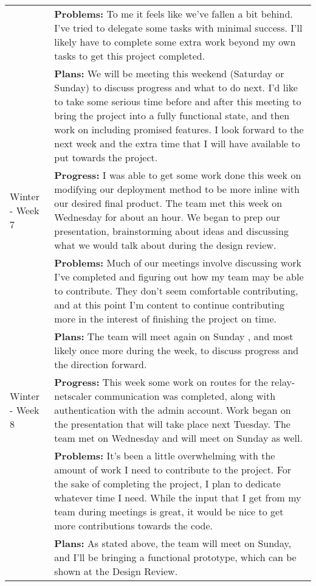 \begin{longtable}[ht]{| p{1.5cm} | p{13.5cm} |}
     \\ & \textbf{Problems:} To me it feels like we've fallen a bit behind.
     I've tried to delegate some tasks with minimal success.
     I'll likely have to complete some extra work beyond my own tasks to get this project completed.
     \\ & \textbf{Plans:} We will be meeting this weekend (Saturday or Sunday) to discuss progress and what to do next.
     I'd like to take some serious time before and after this meeting to bring the project into a fully functional state, and then work on including promised features.
     I look forward to the next week and the extra time that I will have available to put towards the project.
     \\
     \hline
     Winter - Week 7 &
     \textbf{Progress:} I was able to get some work done this week on modifying our deployment method to be more inline with our desired final product.
     The team met this week on Wednesday for about an hour.
     We began to prep our presentation, brainstorming about ideas and discussing what we would talk about during the design review.
     \\ & \textbf{Problems:} Much of our meetings involve discussing work I've completed and figuring out how my team may be able to contribute.
     They don't seem comfortable contributing, and at this point I'm content to continue contributing more in the interest of finishing the project on time.
     \\ & \textbf{Plans:} The team will meet again on Sunday , and most likely once more during the week, to discuss progress and the direction forward.
     \\
     \hline
     Winter - Week 8 &
     \textbf{Progress:} This week some work on routes for the relay-netscaler communication was completed, along with authentication with the admin account.
     Work began on the presentation that will take place next Tuesday.
     The team met on Wednesday and will meet on Sunday as well.
     \\ & \textbf{Problems:} It's been a little overwhelming with the amount of work I need to contribute to the project.
     For the sake of completing the project, I plan to dedicate whatever time I need.
     While the input that I get from my team during meetings is great, it would be nice to get more contributions towards the code.
     \\ & \textbf{Plans:} As stated above, the team will meet on Sunday, and I'll be bringing a functional prototype, which can be shown at the Design Review.

\end{longtable}
